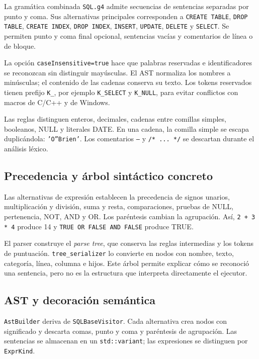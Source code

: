 \documentclass[11pt,a4paper]{article}
\begin{document}
La gramática combinada \texttt{SQL.g4} admite secuencias de sentencias
separadas por punto y coma. Sus alternativas principales corresponden a
\texttt{CREATE TABLE}, \texttt{DROP TABLE}, \texttt{CREATE INDEX},
\texttt{DROP INDEX}, \texttt{INSERT}, \texttt{UPDATE}, \texttt{DELETE} y
\texttt{SELECT}. Se permiten punto y coma final opcional, sentencias vacías
y comentarios de línea o de bloque.

La opción \texttt{caseInsensitive=true} hace que palabras reservadas e
identificadores se reconozcan sin distinguir mayúsculas. El AST normaliza
los nombres a minúsculas; el contenido de las cadenas conserva su texto.
Los tokens reservados tienen prefijo \texttt{K\_}, por ejemplo
\texttt{K\_SELECT} y \texttt{K\_NULL}, para evitar conflictos con macros de
C/C++ y de Windows.

Las reglas distinguen enteros, decimales, cadenas entre comillas simples,
booleanos, NULL y literales DATE. En una cadena, la comilla simple se
escapa duplicándola: \texttt{'O''Brien'}. Los comentarios \texttt{--} y
\texttt{/* ... */} se descartan durante el análisis léxico.

\subsection{Precedencia y árbol sintáctico concreto}

Las alternativas de expresión establecen la precedencia de signos unarios,
multiplicación y división, suma y resta, comparaciones, pruebas de NULL,
pertenencia, NOT, AND y OR. Los paréntesis cambian la agrupación.
Así, \texttt{2 + 3 * 4} produce 14 y \texttt{TRUE OR FALSE AND FALSE}
produce TRUE.

El parser construye el \emph{parse tree}, que conserva las reglas
intermedias y los tokens de puntuación. \texttt{tree\_serializer} lo
convierte en nodos con nombre, texto, categoría, línea, columna e hijos.
Este árbol permite explicar cómo se reconoció una sentencia, pero no es
la estructura que interpreta directamente el ejecutor.

\subsection{AST y decoración semántica}

\texttt{AstBuilder} deriva de \texttt{SQLBaseVisitor}. Cada alternativa
crea nodos con significado y descarta comas, punto y coma y paréntesis de
agrupación. Las sentencias se almacenan en un \texttt{std::variant}; las
expresiones se distinguen por \texttt{ExprKind}.
\end{document}
